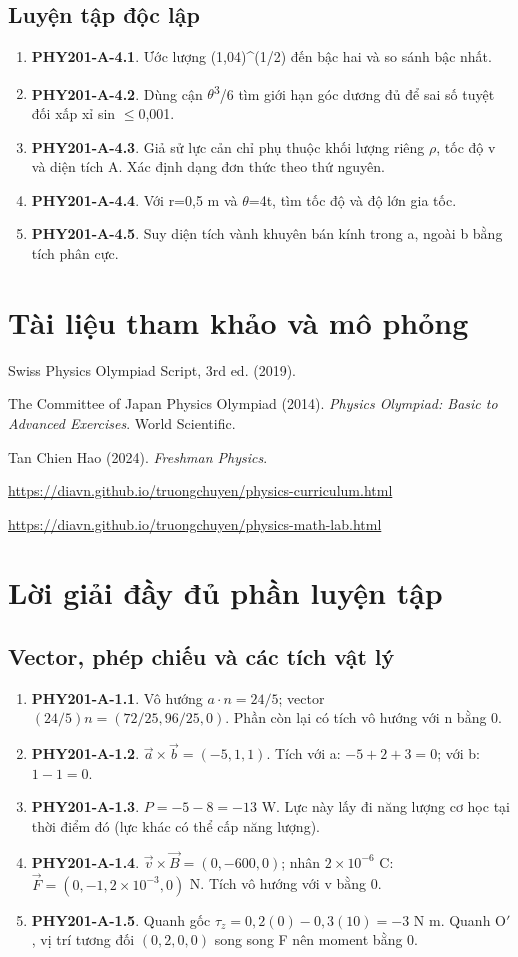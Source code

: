 \documentclass[11pt,a4paper,openany]{book}
\begin{document}
\section{Luyện tập độc lập}
\begin{enumerate}
\item \textbf{PHY201-A-4.1}. Ước lượng (1,04)^(1/2) đến bậc hai và so sánh bậc nhất.
\item \textbf{PHY201-A-4.2}. Dùng cận \ensuremath{\theta}\textsuperscript{3}/6 tìm giới hạn góc dương đủ để sai số tuyệt đối xấp xỉ sin \ensuremath{\le}0,001.
\item \textbf{PHY201-A-4.3}. Giả sử lực cản chỉ phụ thuộc khối lượng riêng \ensuremath{\rho}, tốc độ v và diện tích A. Xác định dạng đơn thức theo thứ nguyên.
\item \textbf{PHY201-A-4.4}. Với r=0,5 m và \ensuremath{\theta}=4t, tìm tốc độ và độ lớn gia tốc.
\item \textbf{PHY201-A-4.5}. Suy diện tích vành khuyên bán kính trong a, ngoài b bằng tích phân cực.
\end{enumerate}
\chapter*{Tài liệu tham khảo và mô phỏng}
Swiss Physics Olympiad Script, 3rd ed. (2019).\par
The Committee of Japan Physics Olympiad (2014). \textit{Physics Olympiad: Basic to Advanced Exercises}. World Scientific.\par
Tan Chien Hao (2024). \textit{Freshman Physics}.\par
\url{https://diavn.github.io/truongchuyen/physics-curriculum.html}\par
\url{https://diavn.github.io/truongchuyen/physics-math-lab.html}
\appendix
\chapter{Lời giải đầy đủ phần luyện tập}
\section{Vector, phép chiếu và các tích vật lý}
\begin{enumerate}
\item \textbf{PHY201-A-1.1}. Vô hướng $a\cdot n=24/5$; vector $(24/5)n=(72/25,96/25,0)$. Phần còn lại có tích vô hướng với n bằng 0.
\item \textbf{PHY201-A-1.2}. $\vec a\times\vec b=(-5,1,1)$. Tích với a: $-5+2+3=0$; với b: $1-1=0$.
\item \textbf{PHY201-A-1.3}. $P=-5-8=-13$ W. Lực này lấy đi năng lượng cơ học tại thời điểm đó (lực khác có thể cấp năng lượng).
\item \textbf{PHY201-A-1.4}. $\vec v\times\vec B=(0,-600,0)$; nhân $2\times10^{-6}$ C: $\vec F=(0,-1{,}2\times10^{-3},0)$ N. Tích vô hướng với v bằng 0.
\item \textbf{PHY201-A-1.5}. Quanh gốc $\tau_z=0{,}2(0)-0{,}3(10)=-3$ N m. Quanh O\ensuremath{\prime}, vị trí tương đối $(0{,}2,0,0)$ song song F nên moment bằng 0.
\end{enumerate}
\end{document}
